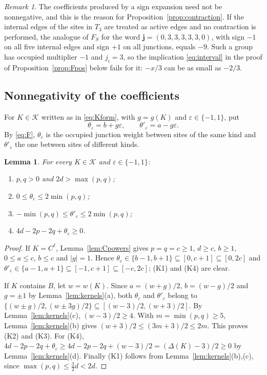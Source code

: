 \documentclass{amsart}
\newtheorem{lemma}[theorem]{Lemma}
\theoremstyle{definition}
\theoremstyle{remark}
\newtheorem{remark}[theorem]{Remark}
\numberwithin{equation}{section}
\newcommand{\jj}{\mathbf{j}}
\newcommand{\cK}{\mathcal{K}}
\begin{document}
\begin{remark}\label{rem:negative}
The coefficients produced by a sign expansion need not be nonnegative, and this is the reason for Proposition~\ref{prop:contraction}. If the internal edges of the sites in $T_3$ are treated as active edges and no contraction is performed, the analogue of $F_S$ for the word $\jj=(0,3,3,3,3,3,0)$, with sign $-1$ on all five internal edges and sign $+1$ on all junctions, equals $-9$. Such a group has occupied multiplier $-1$ and $j_i=3$, so the implication \eqref{eq:interval} in the proof of Proposition~\ref{prop:Fpos} below fails for it: $-x/3$ can be as small as $-2/3$.
\end{remark}

\subsection{Nonnegativity of the coefficients}
For $K\in\cK$ written as in \eqref{eq:Kform}, with $g=g(K)$ and $\varepsilon\in\{-1,1\}$, put
\[
\theta_\varepsilon=b+g\varepsilon,\qquad\theta'_\varepsilon=a-g\varepsilon .
\]
By \eqref{eq:F}, $\theta_\varepsilon$ is the occupied junction weight between sites of the same kind and $\theta'_\varepsilon$ the one between sites of different kinds.

\begin{lemma}\label{lem:ineq}
For every $K\in\cK$ and $\varepsilon\in\{-1,1\}$:
\begin{enumerate}
\item[(K1)] $p,q>0$ and $2d>\max(p,q)$;
\item[(K2)] $0\le\theta_\varepsilon\le2\min(p,q)$;
\item[(K3)] $-\min(p,q)\le\theta'_\varepsilon\le2\min(p,q)$;
\item[(K4)] $4d-2p-2q+\theta_\varepsilon\ge0$.
\end{enumerate}
\end{lemma}

\begin{proof}
If $K=C^\ell$, Lemma~\ref{lem:Cpowers} gives $p=q=c\ge1$, $d\ge c$, $b\ge1$, $0\le a\le c$, $b\le c$ and $|g|=1$. Hence $\theta_\varepsilon\in\{b-1,b+1\}\subseteq[0,c+1]\subseteq[0,2c]$ and $\theta'_\varepsilon\in\{a-1,a+1\}\subseteq[-1,c+1]\subseteq[-c,2c]$; (K1) and (K4) are clear.

If $K$ contains $B$, let $w=w(K)$. Since $a=(w+g)/2$, $b=(w-g)/2$ and $g=\pm1$ by Lemma~\ref{lem:kernels}(a), both $\theta_\varepsilon$ and $\theta'_\varepsilon$ belong to $\{(w\pm g)/2,(w\pm3g)/2\}\subseteq[(w-3)/2,(w+3)/2]$. By Lemma~\ref{lem:kernels}(c), $(w-3)/2\ge4$. With $m=\min(p,q)\ge5$, Lemma~\ref{lem:kernels}(b) gives $(w+3)/2\le(3m+3)/2\le2m$. This proves (K2) and (K3). For (K4), $4d-2p-2q+\theta_\varepsilon\ge4d-2p-2q+(w-3)/2=(\Delta(K)-3)/2\ge0$ by Lemma~\ref{lem:kernels}(d). Finally (K1) follows from Lemma~\ref{lem:kernels}(b),(c), since $\max(p,q)\le\frac32d<2d$.
\end{proof}
\end{document}
